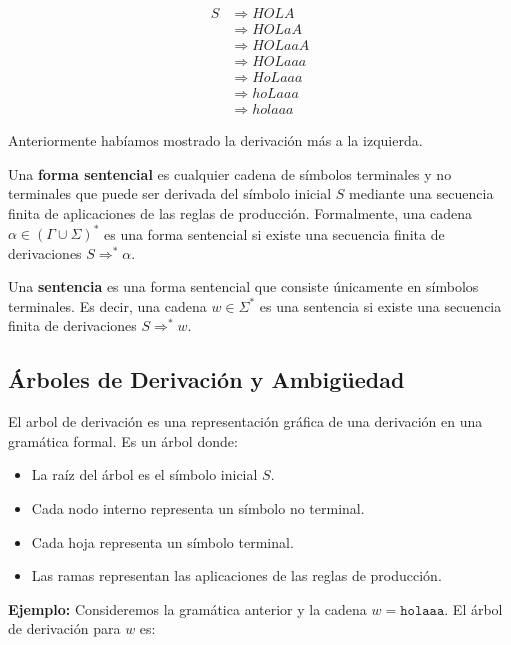 \begin{align*}
    S &\Rightarrow HOLA \\
    &\Rightarrow HOLaA \\
    &\Rightarrow HOLaaA \\
    &\Rightarrow HOLaaa \\
    &\Rightarrow HoLaaa \\
    &\Rightarrow hoLaaa \\
    &\Rightarrow holaaa
\end{align*}

Anteriormente habíamos mostrado la derivación más a la izquierda. 

\begin{Def}
    Una \textbf{forma sentencial} es cualquier cadena de símbolos terminales y no terminales que puede ser derivada del símbolo inicial $S$ mediante una secuencia finita de aplicaciones de las reglas de producción. Formalmente, una cadena $\alpha \in (\Gamma \cup \Sigma)^*$ 
    es una forma sentencial si existe una secuencia finita de derivaciones $S \Rightarrow^{*} \alpha$.
\end{Def}

\begin{Def}
    Una \textbf{sentencia} es una forma sentencial que consiste únicamente en símbolos terminales. Es decir, una cadena $w \in \Sigma^*$ es una sentencia si existe una secuencia finita de derivaciones $S \Rightarrow^{*} w$.
\end{Def}

\subsection{Árboles de Derivación y Ambigüedad}
\begin{Def}
    El arbol de derivación es una representación gráfica de una derivación en una gramática formal. Es un árbol donde:
    \begin{itemize}
        \item La raíz del árbol es el símbolo inicial $S$.
        \item Cada nodo interno representa un símbolo no terminal.
        \item Cada hoja representa un símbolo terminal.
        \item Las ramas representan las aplicaciones de las reglas de producción.
    \end{itemize}
\end{Def}

\textbf{Ejemplo:} Consideremos la gramática anterior y la cadena $w = \texttt{holaaa}$. El árbol de derivación para $w$ es:

